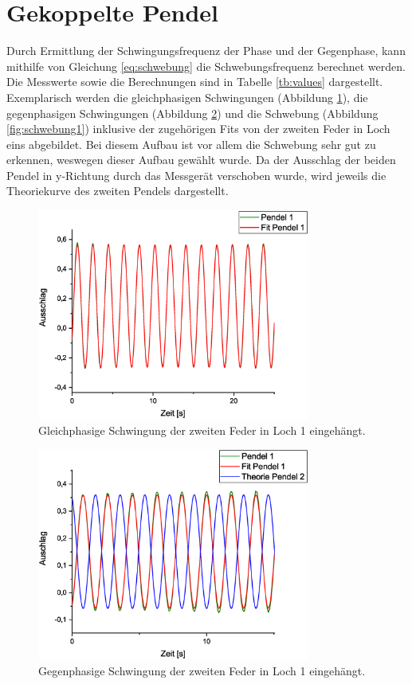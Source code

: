 \section{Gekoppelte Pendel}
Durch Ermittlung der Schwingungsfrequenz der Phase und der Gegenphase, kann mithilfe von Gleichung \ref{eq:schwebung} die Schwebungsfrequenz berechnet werden. Die Messwerte sowie die Berechnungen sind in Tabelle \ref{tb:values} dargestellt.
Exemplarisch werden die gleichphasigen Schwingungen (Abbildung \ref{fig:gleich1}), die gegenphasigen Schwingungen (Abbildung \ref{fig:gegen1}) und die Schwebung (Abbildung \ref{fig:schwebung1}) inklusive der zugehörigen Fits von der zweiten Feder in Loch eins abgebildet. Bei diesem Aufbau ist vor allem die Schwebung sehr gut zu erkennen, weswegen dieser Aufbau gewählt wurde. Da der Ausschlag der beiden Pendel in y-Richtung durch das Messgerät verschoben wurde, wird jeweils die Theoriekurve des zweiten Pendels dargestellt.

\begin{figure}
\begin{center}
\includegraphics[width=0.8\textwidth]{Bilder/Feder2_gleich.eps}
\caption{Gleichphasige Schwingung der zweiten Feder in Loch 1 eingehängt.}
\label{fig:gleich1}
\end{center}
\end{figure}

\begin{figure}
\begin{center}
\includegraphics[width=0.8\textwidth]{Bilder/Feder2_gegen.eps}
\caption{Gegenphasige Schwingung der zweiten Feder in Loch 1 eingehängt.}
\label{fig:gegen1}
\end{center}
\end{figure}

